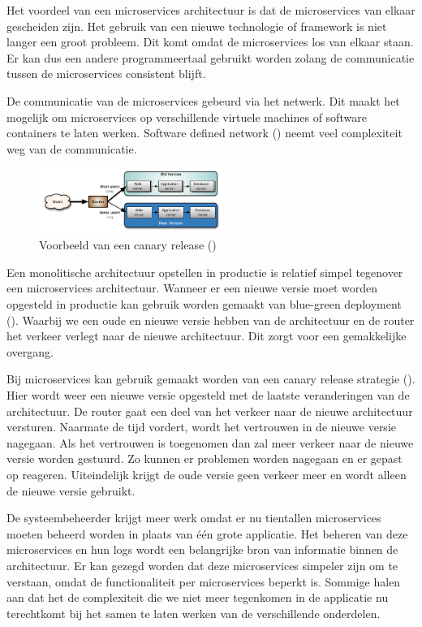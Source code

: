 Het voordeel van een microservices architectuur is dat de microservices van elkaar gescheiden zijn. Het gebruik van een nieuwe technologie of framework is niet langer een groot probleem. Dit komt omdat de microservices los van elkaar staan. Er kan dus een andere programmeertaal gebruikt worden zolang de communicatie tussen de microservices consistent blijft.

De communicatie van de microservices gebeurd via het netwerk. Dit maakt het mogelijk om microservices op verschillende virtuele machines of software containers te laten werken. Software defined network (\cite{garcia_villalba_trends_2015}) neemt veel complexiteit weg van de communicatie.

\begin{figure}
    \centering
    \includegraphics[width=6cm]{img/canary-release}
    \caption[canary release]{Voorbeeld van een canary release (\cite{danilo_sato_canaryrelease_2014})}
    \label{fig:canary-release}
\end{figure}

Een monolitische architectuur opstellen in productie is relatief simpel tegenover een microservices architectuur. Wanneer er een nieuwe versie moet worden opgesteld in productie kan gebruik worden gemaakt van blue-green deployment (\cite{martin_fowler_bluegreendeployment_2016}). Waarbij we een oude en nieuwe versie hebben van de architectuur en de router het verkeer verlegt naar de nieuwe architectuur. Dit zorgt voor een gemakkelijke overgang.

Bij microservices kan gebruik gemaakt worden van een canary release strategie (\cite{danilo_sato_canaryrelease_2014}). Hier wordt weer een nieuwe versie opgesteld met de laatste veranderingen van de architectuur. De router gaat een deel van het verkeer naar de nieuwe architectuur versturen. Naarmate de tijd vordert, wordt het vertrouwen in de nieuwe versie nagegaan. Als het vertrouwen is toegenomen dan zal meer verkeer naar de nieuwe versie worden gestuurd. Zo kunnen er problemen worden nagegaan en er gepast op reageren. Uiteindelijk krijgt de oude versie geen verkeer meer en wordt alleen de nieuwe versie gebruikt.

De systeembeheerder krijgt meer werk omdat er nu tientallen microservices moeten beheerd worden in plaats van één grote applicatie. Het beheren van deze microservices en hun logs wordt een belangrijke bron van informatie binnen de architectuur. Er kan gezegd worden dat deze microservices simpeler zijn om te verstaan, omdat de functionaliteit per microservices beperkt is. Sommige halen aan dat het de complexiteit die we niet meer tegenkomen in de applicatie nu terechtkomt bij het samen te laten werken van de verschillende onderdelen.